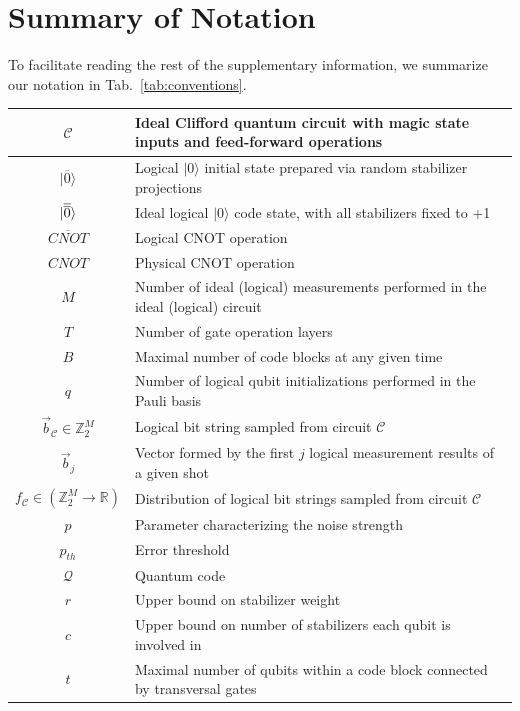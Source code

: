 \section{Summary of Notation}

To facilitate reading the rest of the supplementary information, we summarize our notation in Tab.~\ref{tab:conventions}.

\begin{table}
\begin{tabular}{|c|l|}
\hline
$\mathcal{C}$ & Ideal Clifford quantum circuit with magic state inputs and feed-forward operations\\\hline
$|\overline{0}\rangle$ & Logical $|0\rangle$ initial state prepared via random stabilizer projections\\\hline
$|\overline{\overline{0}}\rangle$ & Ideal logical $|0\rangle$ code state, with all stabilizers fixed to +1\\\hline
$\overline{CNOT}$ & Logical CNOT operation\\\hline
$CNOT$ & Physical CNOT operation\\\hline
$M$ & Number of ideal (logical) measurements performed in the ideal (logical) circuit\\\hline
$T$ & Number of gate operation layers\\\hline
$B$ & Maximal number of code blocks at any given time\\\hline
$q$ & Number of logical qubit initializations performed in the Pauli basis\\\hline
$\vec{b}_{\mathcal{C}}\in \mathbb{Z}_2^M$  & Logical bit string sampled from circuit $\mathcal{C}$\\\hline
$\vec{b}_j$ & Vector formed by the first $j$ logical measurement results of a given shot\\\hline
$f_{\mathcal{C}}\in (\mathbb{Z}_2^M\rightarrow \mathbb{R})$ & Distribution of logical bit strings sampled from circuit $\mathcal{C}$\\\hline
$p$ & Parameter characterizing the noise strength\\\hline
$p_{th}$ & Error threshold\\\hline
$\mathcal{Q}$ & Quantum code\\\hline
$r$ & Upper bound on stabilizer weight\\\hline
$c$ & Upper bound on number of stabilizers each qubit is involved in\\\hline
$t$ & Maximal number of qubits within a code block connected by transversal gates \\\hline

\end{tabular}
\end{table}
